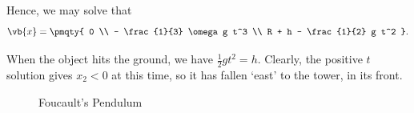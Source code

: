 \begin{example}
    Hence, we may solve that
    \begin{equation}
        \vb{x} = \pmqty{
            0 \\
            - \frac{1}{3} \omega g t^3 \\
            R + h - \frac{1}{2} g t^2
        }.
    \end{equation}

    When the object hits the ground, we have \(\frac{1}{2} g t^2 = h\). Clearly, the positive \(t\) solution gives \(x_2 < 0\) at this time, so it has fallen `east' to the tower, in its front.
\end{example}

\begin{figure}[ht!]
    \centering

    \caption{Foucault's Pendulum}
    \label{fig:foucault}%
\end{figure}

